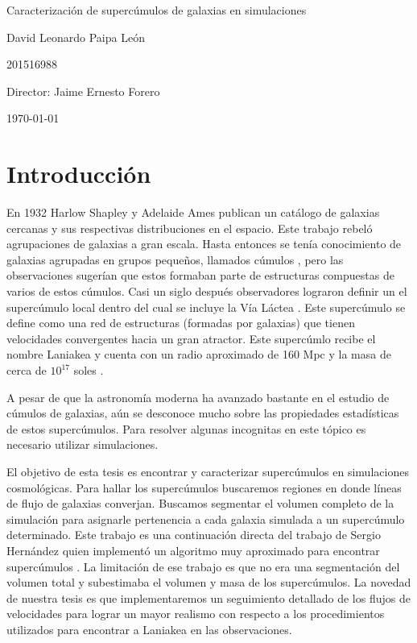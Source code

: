 \documentclass[12pt]{article}
\begin{document}
\begin{center}
\Huge
Caracterización de supercúmulos de galaxias en simulaciones

\vspace{3mm}
\Large David Leonardo Paipa León


\large
201516988


\vspace{2mm}
\Large
Director: Jaime Ernesto Forero

\normalsize
\vspace{2mm}

\today
\end{center}


\normalsize
\section{Introducción}


En 1932 Harlow Shapley y Adelaide Ames publican un catálogo de
galaxias cercanas y sus respectivas distribuciones en el
espacio\cite{catalog}\cite{Shapley}.
Este trabajo rebel\'o agrupaciones de galaxias a gran escala. 
Hasta entonces se tenía conocimiento de galaxias agrupadas en grupos
pequeños, llamados cúmulos ,  pero las observaciones sugerían que estos formaban parte de estructuras
compuestas de varios de estos cúmulos. 
Casi un siglo despu\'es observadores lograron definir un 
el supercúmulo local dentro del cual se incluye la Vía Láctea \cite{tully}. 
Este supercúmulo se define como una red de estructuras (formadas por galaxias)
que tienen velocidades convergentes hacia un gran atractor.
Este superc\'umlo recibe el nombre Laniakea y cuenta con un radio
aproximado de 160 Mpc y la masa de cerca de $10^{17}$ soles
\cite{nature}.

A pesar de que la astronomía moderna ha avanzado bastante en el
estudio de cúmulos de galaxias, aún se desconoce mucho sobre las
propiedades estadísticas de estos supercúmulos. 
Para resolver
algunas incognitas en este tópico es necesario utilizar simulaciones.

El objetivo de esta tesis es encontrar y caracterizar supercúmulos en
simulaciones cosmol\'ogicas.
Para hallar los supercúmulos buscaremos regiones en donde l\'ineas de
flujo de galaxias converjan.
Buscamos segmentar el volumen completo de la simulaci\'on para
asignarle pertenencia a cada galaxia simulada a un superc\'umulo
determinado. 
Este trabajo es una continuaci\'on directa del trabajo de Sergio
Hern\'andez quien implement\'o un algoritmo muy aproximado para 
encontrar superc\'umulos \cite{Hernandez}. 
La limitaci\'on de ese trabajo es que no era una segmentaci\'on del
volumen total y subestimaba el volumen y masa de los superc\'umulos.
La novedad de nuestra tesis es que implementaremos un seguimiento
detallado de los flujos de velocidades para lograr un mayor realismo
con respecto a los procedimientos utilizados para encontrar a Laniakea
en las observaciones.
\end{document}
